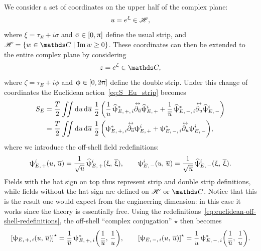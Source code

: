 We consider a set of coordinates on the upper half \ccH of the complex plane:
\begin{equation}
  u = e^{\upxi} \in \mathscr{H},
\end{equation}
where $\xi = \tau_E + i \sigma$ and $\upsigma \in \qty[ 0, \uppi ]$ define the usual strip, and $\ccH = \qty{ w \in \C \mid \Im w \ge 0 }$.
These coordinates can then be extended to the entire complex plane by considering
\begin{equation}
  z = e^{\zeta} \in \C,
\end{equation}
where $\zeta = \tau_E + i \phi$ and $\upphi \in \qty[0, 2\uppi ]$ define the double strip.
Under this change of coordinates the Euclidean action~\eqref{eq:S_Eu_strip} becomes
\begin{equation}
  \begin{split}
    S_E
    & =
    \frac{T}{2}
    \iint \dd{u}\dd{\ensuremath{\overline{u}}}\,
    \frac{1}{2}\,
    \qty(
      \frac{1}{u}\, \widehat{\uppsi}_{E,\, +,\, i}^* \overset{\leftrightarrow}{\partial_{\overline{u}}} \widehat{\uppsi}_{E,\, +}^i
      +
      \frac{1}{\overline{u}}\, \widehat{\uppsi}_{E,\, -,\, i}^* \overset{\leftrightarrow}{\partial_{u}} \widehat{\uppsi}_{E,\, -}^i
    )
    \\
    & =
    \frac{T}{2}
    \iint \dd{u}\dd{\ensuremath{\overline{u}}}\,
    \frac{1}{2}\,
    \qty(
      \uppsi_{E,\, +,\, i}^* \overset{\leftrightarrow}{\partial_{\overline{u}}} \uppsi_{E,\, +}^i
      +
      \uppsi_{E,\, -,\, i}^* \overset{\leftrightarrow}{\partial_{u}} \uppsi_{E,\, -}^i
    ),
  \end{split}
\end{equation}
where we introduce the off-shell field redefinitions:
\begin{equation}
  \uppsi_{E,\, +}^i(u,\, \overline{u})
  =
  \frac{1}{\sqrt{u}}\, \widehat{\uppsi}_{E,\, +}^i( \upxi,\, \overline{\upxi} ),
  \qquad
  \uppsi_{E,\, -}^i(u,\, \overline{u})
  =
  \frac{1}{\sqrt{\overline{u}}}\, \widehat{\uppsi}_{E,\, -}^i( \upxi,\, \overline{\upxi} ).
  \label{eq:euclidean-off-shell-redefinitions}
\end{equation}
Fields with the hat sign on top thus represent strip and double strip definitions, while fields without the hat sign are defined on $\mathscr{H}$ or $\C$.\footnotemark{}
Notice that this is the result one would expect from the engineering dimension: in this case it works since the theory is essentially free.
Using the redefinitions~\eqref{eq:euclidean-off-shell-redefinitions}, the off-shell ``complex conjugation'' $\star$ then becomes
\begin{equation}
  \qty[ \uppsi_{E,\, +,\, i}( u,\, \overline{u} ) ]^\star
  =
  \frac{1}{\overline{u}}\, \uppsi_{E,\, +,\, i}^*\qty( \frac{1}{\overline{u}},\, \frac{1}{u} ),
  \qquad
  \qty[ \uppsi_{E,\, -,\, i}( u,\, \overline{u} ) ]^\star
  =
  \frac{1}{u}\, \uppsi_{E,\, -,\, i}^*\qty( \frac{1}{\overline{u}},\, \frac{1}{u} ).
\end{equation}

